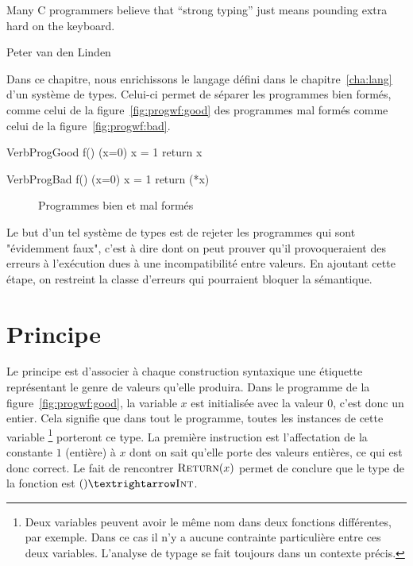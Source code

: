 \epigraph
{ Many C programmers believe that ``strong typing''
  just means pounding extra hard on the keyboard.
}
{Peter van den Linden}

Dans ce chapitre, nous enrichissons le langage défini dans le
chapitre~\ref{cha:lang} d'un système de types. Celui-ci permet de séparer les
programmes bien formés, comme celui de la figure~\ref{fig:progwf:good} des
programmes mal formés comme celui de la figure~\ref{fig:progwf:bad}.

\begin{SaveVerbatim}[]{VerbProgGood}
f()
(x=0)
{
  x = 1
  return x
}
\end{SaveVerbatim}

\begin{SaveVerbatim}[]{VerbProgBad}
f()
(x=0)
{
  x = 1
  return (*x)
}
\end{SaveVerbatim}

\begin{figure}

  \centering

  \hspace{2cm}

  \caption{Programmes bien et mal formés}
  \label{fig:progwf}

\end{figure}

Le but d'un tel système de types est de rejeter les programmes qui sont
"évidemment faux", c'est à dire dont on peut prouver qu'il provoqueraient des
erreurs à l'exécution dues à une incompatibilité entre valeurs. En ajoutant
cette étape, on restreint la classe d'erreurs qui pourraient bloquer la
sémantique.

\section{Principe}

Le principe est d'associer à chaque construction syntaxique une étiquette
représentant le genre de valeurs qu'elle produira. Dans le programme de la
figure~\ref{fig:progwf:good}, la variable $x$ est initialisée avec la valeur
$0$, c'est donc un entier. Cela signifie que dans tout le programme, toutes les
instances de cette variable
\footnote{Deux variables peuvent avoir le même nom dans deux fonctions
  différentes, par exemple. Dans ce cas il n'y a aucune contrainte particulière
  entre ces deux variables. L'analyse de typage se fait toujours dans un
  contexte précis.
}
porteront ce type. La première instruction est l'affectation de la constante $1$
(entière) à $x$ dont on sait qu'elle porte des valeurs entières, ce qui est donc
correct. Le fait de rencontrer $\textsc{Return}(x)$ permet de conclure que le type de
la fonction est $() → \tInt$.

